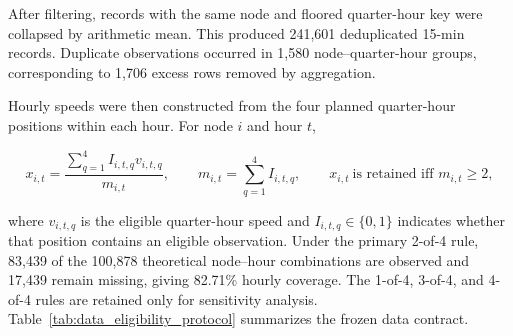 \documentclass[pdflatex,sn-basic,Numbered]{sn-jnl}
\begin{document}
After filtering, records with the same node and floored quarter-hour key were collapsed by arithmetic mean. This produced 241,601 deduplicated 15-min records. Duplicate observations occurred in 1,580 node--quarter-hour groups, corresponding to 1,706 excess rows removed by aggregation.

Hourly speeds were then constructed from the four planned quarter-hour positions within each hour. For node $i$ and hour $t$,

\begin{equation}
x_{i,t}=\frac{\sum_{q=1}^{4} I_{i,t,q}v_{i,t,q}}{m_{i,t}},
\qquad
m_{i,t}=\sum_{q=1}^{4}I_{i,t,q},
\qquad
x_{i,t}\ \text{is retained iff }m_{i,t}\geq2,
\label{eq:hourly_aggregation}
\end{equation}

where $v_{i,t,q}$ is the eligible quarter-hour speed and $I_{i,t,q}\in\{0,1\}$ indicates whether that position contains an eligible observation. Under the primary 2-of-4 rule, 83,439 of the 100,878 theoretical node--hour combinations are observed and 17,439 remain missing, giving 82.71\% hourly coverage. The 1-of-4, 3-of-4, and 4-of-4 rules are retained only for sensitivity analysis. Table~\ref{tab:data_eligibility_protocol} summarizes the frozen data contract.
\end{document}
